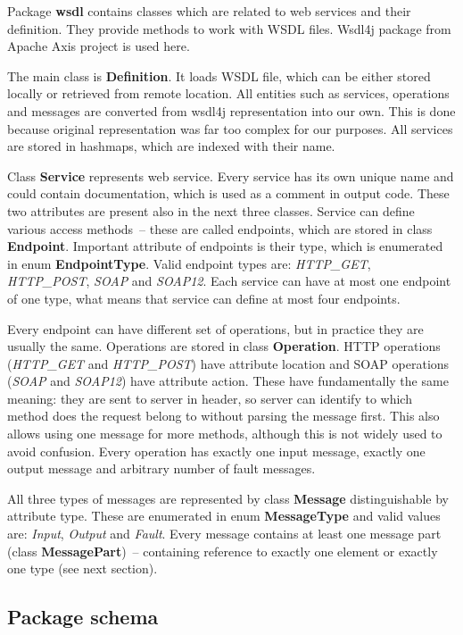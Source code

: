 \documentclass[12pt,notitlepage]{report}
\begin{document}
Package \textbf{wsdl} contains classes which are related to web services and their definition. They provide methods to work with WSDL files. Wsdl4j package from Apache Axis project is used here.

The main class is \textbf{Definition}. It loads WSDL file, which can be either stored locally or retrieved from remote location. All entities such as services, operations and messages are converted from wsdl4j representation into our own. This is done because original representation was far too complex for our purposes. All services are stored in hashmaps, which are indexed with their name. 

Class \textbf{Service} represents web service. Every service has its own unique name and could contain documentation, which is used as a comment in output code. These two attributes are present also in the next three classes. Service can define various access methods~-- these are called endpoints, which are stored in class \textbf{Endpoint}. Important attribute of endpoints is their type, which is enumerated in enum \textbf{EndpointType}. Valid endpoint types are: \textit{HTTP\_GET}, \textit{HTTP\_POST}, \textit{SOAP} and \textit{SOAP12}. Each service can have at most one endpoint of one type, what means that service can define at most four endpoints.

Every endpoint can have different set of operations, but in practice they are usually the same. Operations are stored in class \textbf{Operation}. HTTP operations (\textit{HTTP\_GET} and \textit{HTTP\_POST}) have attribute location and SOAP operations (\textit{SOAP} and \textit{SOAP12}) have attribute action. These have fundamentally the same meaning: they are sent to server in header, so server can identify to which method does the request belong to without parsing the message first. This also allows using one message for more methods, although this is not widely used to avoid confusion. Every operation has exactly one input message, exactly one output message and arbitrary number of fault messages.

All three types of messages are represented by class \textbf{Message} distinguishable by attribute type. These are enumerated in enum \textbf{MessageType} and valid values are: \textit{Input}, \textit{Output} and \textit{Fault}. Every message contains at least one message part (class \textbf{MessagePart})~-- containing reference to exactly one element or exactly one type (see next section).

\subsection{Package schema}
\end{document}
